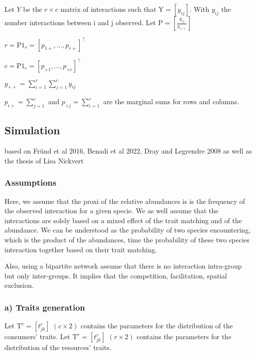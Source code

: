 \documentclass{article}
\begin{document}
Let $Y$ be the $r\times c$ matrix of interactions such that $\textrm{Y} = [y_{ij}]$. With $y_{ij}$ the number interactions between i and j observed.
Let $\textrm{P}=[\frac{y_{ij}}{y_{++}}]$

$r=\textrm{P1}_r =[p_{1+}, ..., p_{r+}]^\intercal$

$c=\textrm{P1}_c=[p_{+1}, ..., p_{+c}]^\intercal$

$y_{++}=\sum_{i=1}^{r}\sum_{j=1}^{c}y_{ij}$

$p_{i+}=\sum_{j=1}^{c}$ and $p_{+j}=\sum_{i=1}^{r}$ are the marginal sums for rows and columns.














\subsection{Simulation}

based on Fründ et al 2016, Benadi et al 2022, Dray and Legrendre 2008 as well as the thesis of Lisa Nickvert

\subsubsection{Assumptions}
Here, we assume that the proxi of the relative abundances is is the frequency of the observed interaction for a given specie. We as well assume that the interactions are solely based on a mixed effect of the trait matching and of the abundance. We can be understood as the probability of two species encountering, which is the product of the abundances, time the probability of these two species interaction together based on their trait matching.

Also, using a bipartite network assume that there is no interaction intra-group but only inter-groups. It implies that the competition, facilitation, spatial exclusion.




\subsubsection{a) Traits generation}
Let $\textrm{T}^c = [t^c_{jk}]$ $(c \times 2)$ contains the parameters for the distribution of the consumers' traits. 
Let $\textrm{T}^r = [t^r_{jk}]$ $(r \times 2)$ contains the parameters for the distribution of the resources' traits. 
\end{document}
